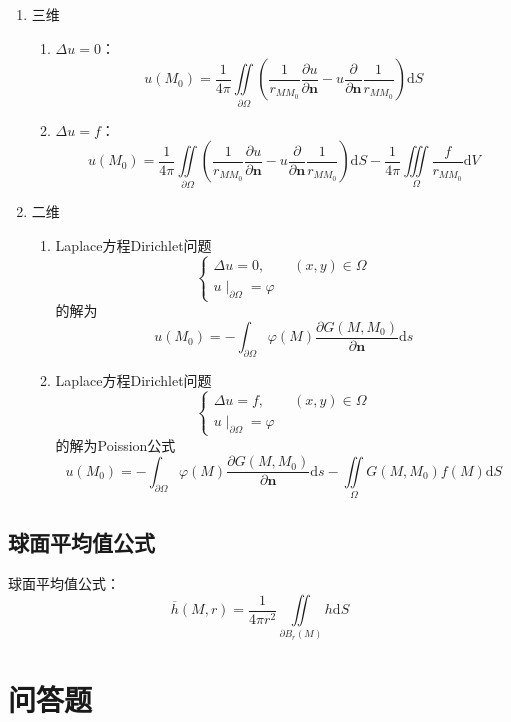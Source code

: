\documentclass[lang = cn, scheme = chinese, thmcnt = section]{elegantbook}
\newcommand{\bs}{\boldsymbol}          %
\newcommand{\dd}{\mathrm{d}}           %
\newcommand{\IInt}{\iint\limits}
\newcommand{\IIInt}{\iiint\limits}
\begin{document}
\begin{note}
	\begin{enumerate}
		\item 三维
		\begin{enumerate}
			\item $\Delta u=0$：
			$$
			u(M_0)=\frac{1}{4\pi}\IInt_{\partial\Omega}\left(\frac{1}{r_{MM_0}}\frac{\partial u}{\partial \bs{n}}-u\frac{\partial }{\partial\bs{n}}\frac{1}{r_{MM_0}}\right)\dd S
			$$
			\item $\Delta u=f$：
			$$
			u(M_0)=\frac{1}{4\pi}\IInt_{\partial\Omega}\left(\frac{1}{r_{MM_0}}\frac{\partial u}{\partial \bs{n}}-u\frac{\partial }{\partial\bs{n}}\frac{1}{r_{MM_0}}\right)\dd S-\frac{1}{4\pi}\IIInt_{\Omega}\frac{f}{r_{MM_0}}\dd V
			$$
		\end{enumerate}
		\item 二维
		\begin{enumerate}
			\item Laplace方程Dirichlet问题
			$$
			\begin{cases}
				\Delta u=0,\qquad (x,y)\in\Omega\\
				u\mid_{\partial\Omega}=\varphi
			\end{cases}
			$$
			的解为
			$$
			u(M_0)=-\int_{\partial\Omega}\varphi(M)\frac{\partial G(M,M_0)}{\partial\bs{n}}\dd s
			$$
			\item Laplace方程Dirichlet问题
			$$
			\begin{cases}
				\Delta u=f,\qquad (x,y)\in\Omega\\
				u\mid_{\partial\Omega}=\varphi
			\end{cases}
			$$
			的解为Poission公式
			$$
			u(M_0)=-\int_{\partial\Omega}\varphi(M)\frac{\partial G(M,M_0)}{\partial\bs{n}}\dd s-\IInt_{\Omega}G(M,M_0)f(M)\dd S
			$$
		\end{enumerate}
	\end{enumerate}
\end{note}

\subsection{球面平均值公式}

\begin{note}
	球面平均值公式：
	$$
	\overline{h}(M,r)=\frac{1}{4\pi r^2}\IInt_{\partial B_r(M)}h\dd S
	$$
\end{note}

\section{问答题}
\end{document}

